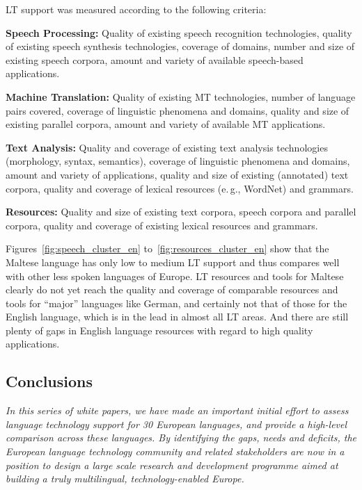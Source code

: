 \begin{multicols}{2}
LT support was measured according to the following criteria:

\textbf{Speech Processing:} Quality of existing speech recognition technologies, quality of existing speech synthesis technologies, coverage of domains, number and size of existing speech corpora, amount and variety of available speech-based applications.\vspace*{0.09cm}

\textbf{Machine Translation:} Quality of existing MT technologies, number of language pairs covered, coverage of linguistic phenomena and domains, quality and size of existing parallel corpora, amount and variety of available MT applications.\vspace*{0.09cm}

\textbf{Text Analysis:} Quality and coverage of existing text analysis technologies (morphology, syntax, semantics), coverage of linguistic phenomena and domains, amount and variety of applications, quality and size of existing (annotated) text corpora, quality and coverage of lexical resources (e.\,g., WordNet) and grammars.\vspace*{0.09cm}

\textbf{Resources:} Quality and size of existing text corpora, speech corpora and parallel corpora, quality and coverage of existing lexical resources and grammars.\vspace*{0.09cm}

Figures~\ref{fig:speech_cluster_en} to~\ref{fig:resources_cluster_en} show that the Maltese language has only low to medium LT support and thus compares well with other less spoken languages of Europe. LT resources and tools for Maltese clearly do not yet reach the quality and coverage of comparable resources and tools for “major” languages like German, and certainly not that of those for the English language, which is in the lead in almost all LT areas. And there are still plenty of gaps in English language resources with regard to high quality applications. %

\subsection{Conclusions}

\emph{In this series of white papers, we have made an important initial effort to assess language technology support for 30 European languages, and provide a high-level comparison across these languages. By identifying the gaps, needs and deficits, the European language technology community and related stakeholders are now in a position to design a large scale research and development programme aimed at building a truly multilingual, technology-enabled Europe.}


\end{multicols}
